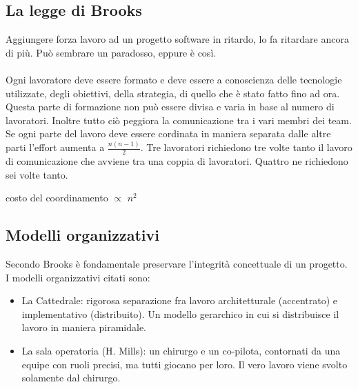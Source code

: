 \subsection{La legge di Brooks}
\begin{center}
\end{center}
Aggiungere forza lavoro ad un progetto software in ritardo, lo fa ritardare ancora di più. Può sembrare un paradosso, eppure è così.\\\\
Ogni lavoratore deve essere formato e deve essere a conoscienza delle tecnologie utilizzate, degli obiettivi, della strategia, di quello che è stato fatto fino ad ora. Questa parte di formazione non può essere divisa e varia in base al numero di lavoratori. Inoltre tutto ciò peggiora la comunicazione tra i vari membri dei team. Se ogni parte del lavoro deve essere cordinata in maniera separata dalle altre parti l'effort aumenta a \(\frac{n(n-1)}{2}\). Tre lavoratori richiedono tre volte tanto il lavoro di comunicazione che avviene tra una coppia di lavoratori. Quattro ne richiedono sei volte tanto.
\begin{center}
    costo del coordinamento \(\propto\) \(n^2\)
\end{center}

\subsection{Modelli organizzativi}
Secondo Brooks è fondamentale preservare l'integrità concettuale di un progetto. I modelli organizzativi citati sono:
\begin{itemize}
    \item La Cattedrale: rigorosa separazione fra lavoro architetturale (accentrato) e implementativo (distribuito). Un modello gerarchico in cui si distribuisce il lavoro in maniera piramidale.
    \item La sala operatoria (H. Mills): un chirurgo e un co-pilota, contornati da una equipe con ruoli precisi, ma tutti giocano per loro.  Il vero lavoro viene svolto solamente dal chirurgo.
\end{itemize}
